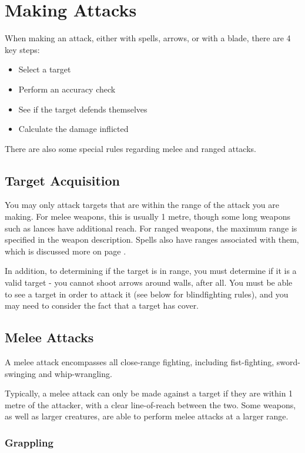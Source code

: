 

\section{Making Attacks}\label{S:Attacks}

When making an attack, either with spells, arrows, or with a blade, there are 4 key steps:
\begin{itemize}
	\item Select a target 
	\item Perform an accuracy check 
	\item See if the target defends themselves
	\item Calculate the damage inflicted
\end{itemize}

There are also some special rules regarding melee and ranged attacks.
\subsection{Target Acquisition}

You may only attack targets that are within the range of the attack you are making. For melee weapons, this is usually 1 metre, though some long weapons such as lances have additional reach. For ranged weapons, the maximum range is specified in the weapon description. Spells also have ranges associated with them, which is discussed more on page \pageref{S:Range}. 

In addition, to determining if the target is in range, you must determine if it is a valid target - you cannot shoot arrows around walls, after all. You must be able to see a target in order to attack it (see below for blindfighting rules), and you may need to consider the fact that a target has cover. 


\subsection{Melee Attacks}

A melee attack encompasses all close-range fighting, including fist-fighting, sword-swinging and whip-wrangling.

Typically, a melee attack can only be made against a target if they are within 1 metre of the attacker, with a clear line-of-reach between the two. Some weapons, as well as larger creatures, are able to perform melee attacks at a larger range.  

\subsubsection{Grappling}

